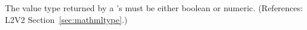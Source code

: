 The value type returned by a \FunctionDefinition's  must be
either boolean or numeric.  (References: L2V2
Section~\ref{sec:mathmltype}.)
